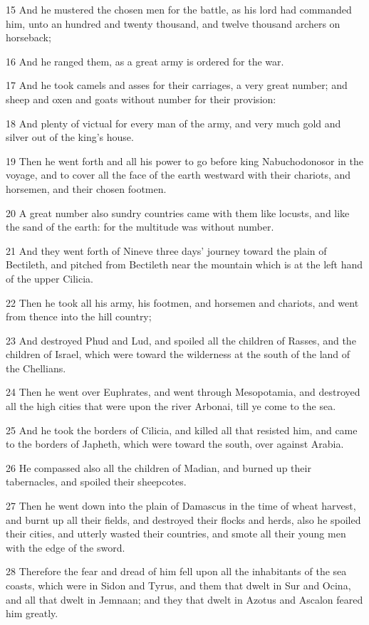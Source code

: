 \par 15 And he mustered the chosen men for the battle, as his lord had commanded him, unto an hundred and twenty thousand, and twelve thousand archers on horseback;
\par 16 And he ranged them, as a great army is ordered for the war.
\par 17 And he took camels and asses for their carriages, a very great number; and sheep and oxen and goats without number for their provision:
\par 18 And plenty of victual for every man of the army, and very much gold and silver out of the king's house.
\par 19 Then he went forth and all his power to go before king Nabuchodonosor in the voyage, and to cover all the face of the earth westward with their chariots, and horsemen, and their chosen footmen.
\par 20 A great number also sundry countries came with them like locusts, and like the sand of the earth: for the multitude was without number.
\par 21 And they went forth of Nineve three days' journey toward the plain of Bectileth, and pitched from Bectileth near the mountain which is at the left hand of the upper Cilicia.
\par 22 Then he took all his army, his footmen, and horsemen and chariots, and went from thence into the hill country;
\par 23 And destroyed Phud and Lud, and spoiled all the children of Rasses, and the children of Israel, which were toward the wilderness at the south of the land of the Chellians.
\par 24 Then he went over Euphrates, and went through Mesopotamia, and destroyed all the high cities that were upon the river Arbonai, till ye come to the sea.
\par 25 And he took the borders of Cilicia, and killed all that resisted him, and came to the borders of Japheth, which were toward the south, over against Arabia.
\par 26 He compassed also all the children of Madian, and burned up their tabernacles, and spoiled their sheepcotes.
\par 27 Then he went down into the plain of Damascus in the time of wheat harvest, and burnt up all their fields, and destroyed their flocks and herds, also he spoiled their cities, and utterly wasted their countries, and smote all their young men with the edge of the sword.
\par 28 Therefore the fear and dread of him fell upon all the inhabitants of the sea coasts, which were in Sidon and Tyrus, and them that dwelt in Sur and Ocina, and all that dwelt in Jemnaan; and they that dwelt in Azotus and Ascalon feared him greatly.

